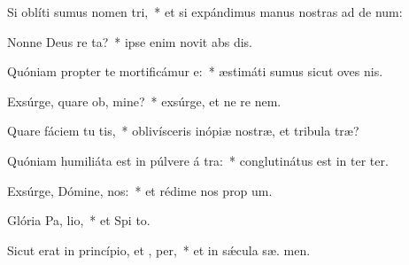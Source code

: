 \item Si oblíti sumus nomen  tri,~* et si expándimus manus nostras ad de num:
\item Nonne Deus re ta?~* ipse enim novit abs dis.
\item Quóniam propter te mortificámur  e:~* æstimáti sumus sicut oves nis.
\item Exsúrge, quare ob, mine?~* exsúrge, et ne re  nem.
\item Quare fáciem tu tis,~* oblivísceris inópiæ nostræ, et tribula træ?
\item Quóniam humiliáta est in púlvere á tra:~* conglutinátus est in ter  ter.
\item Exsúrge, Dómine,  nos:~* et rédime nos prop  um.
\item Glória Pa,  lio,~* et Spi to.
\item Sicut erat in princípio, et ,  per,~* et in sǽcula sæ. men.
